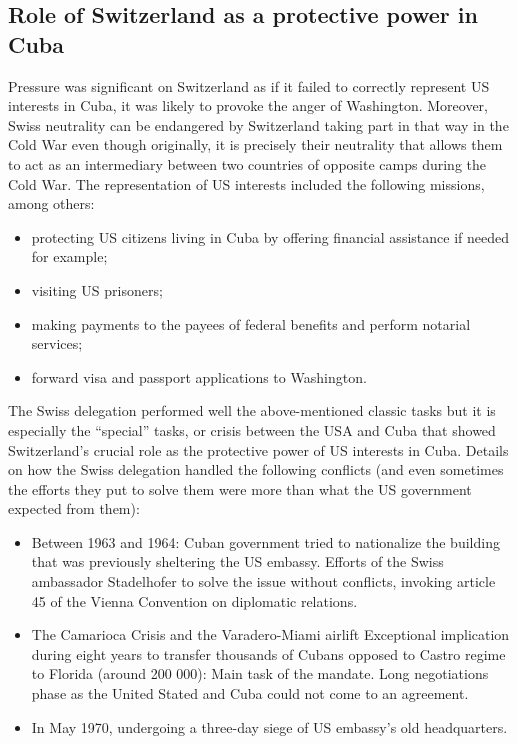 \documentclass[a4paper]{article}
\begin{document}
\subsection{Role of Switzerland as a protective power in Cuba}
Pressure was significant on Switzerland as if it failed to correctly represent US interests in Cuba, it was likely to provoke the anger of Washington. 
Moreover, Swiss neutrality can be endangered by Switzerland taking part in that way in the Cold War even though originally, it is precisely their neutrality that allows them to act as an intermediary between two countries of opposite camps during the Cold War. 
The representation of US interests included the following missions, among others:
\begin{itemize}
\item protecting US citizens living in Cuba by offering financial assistance if needed for example;
\item visiting US prisoners;
\item making payments to the payees of federal benefits and perform notarial services;
\item forward visa and passport applications to Washington.
\end{itemize}
The Swiss delegation performed well the above-mentioned classic tasks but it is especially the “special” tasks, or crisis between the USA and Cuba that showed Switzerland’s crucial role as the protective power of US interests in Cuba. 
Details on how the Swiss delegation handled the following conflicts (and even sometimes the efforts they put to solve them were more than what the US government expected from them): 
\begin{itemize}
\item Between 1963 and 1964: Cuban government tried to nationalize the building that was previously sheltering the US embassy.
Efforts of the Swiss ambassador Stadelhofer to solve the issue without conflicts, invoking article 45 of the Vienna Convention on diplomatic relations. 
\item The Camarioca Crisis and the Varadero-Miami airlift 
Exceptional implication during eight years to transfer thousands of Cubans opposed to Castro regime to Florida (around 200 000): Main task of the mandate.
Long negotiations phase as the United Stated and Cuba could not come to an agreement. 
\item In May 1970, undergoing a three-day siege of US embassy’s old headquarters.
\end{itemize}
\end{document}
